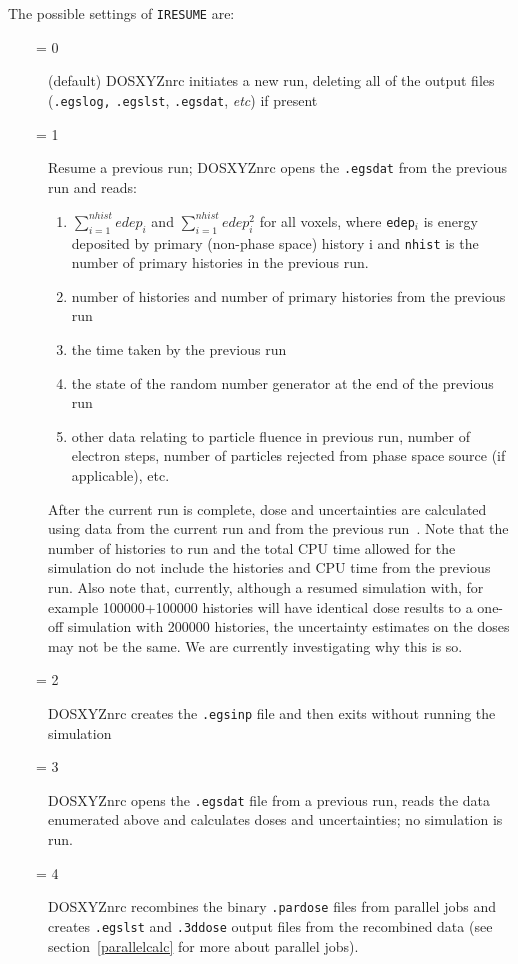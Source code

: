 \documentclass[12pt,twoside]{article}      %
\newcommand{\etc}{{\em etc}}
\newcommand{\indexm}[1]{\index{#1}}
\begin{document}
\indexm{.egsdat}
The possible settings of {\tt IRESUME} are:
\begin{description}
\item [~~~~= 0] (default) DOSXYZnrc initiates a new run, deleting all of the output
files ({\tt .egslog,} {\tt .egslst}, {\tt .egsdat}, \etc) if present
\item [~~~~= 1] Resume a previous run; DOSXYZnrc opens the
{\tt .egsdat} from the previous run and reads:
\begin{enumerate}
\item $\sum_{i=1}^{nhist}edep_i$ and $\sum_{i=1}^{nhist}edep_i^2$ for
all voxels, where {\tt edep$_i$} is energy deposited by primary (non-phase space)
history i
and {\tt nhist} is the number of primary histories in the previous run.
\item number of histories and number of primary histories from the previous run
\item the time taken by the previous run
\item the state of the random number generator at the end of the
previous run
\item other data relating to particle fluence in previous run, number of
electron steps, number of particles rejected from phase space source (if
applicable), etc.
\end{enumerate}
After the current run is complete, dose and
uncertainties are calculated using data from the current run and from
the previous run~\cite{Wa02a}.  Note that the
number of histories to run and the total CPU time allowed for the
simulation do not include the histories and CPU time from the previous run.
Also note that, currently, although a resumed simulation with, for example
100000+100000 histories will have identical dose results to a one-off
simulation
with 200000 histories, the uncertainty estimates on the doses may not be
the same.  We are currently investigating why this is so.
\item [~~~~= 2] DOSXYZnrc creates the {\tt .egsinp} file and then exits without
running the simulation
\item [~~~~= 3] DOSXYZnrc opens the {\tt .egsdat} file from a previous run,
reads the data enumerated above and calculates doses and uncertainties;
no simulation is run.
\indexm{.pardose}
\item [~~~~= 4] DOSXYZnrc recombines the binary {\tt .pardose} files from
parallel jobs and creates {\tt .egslst} and {\tt .3ddose} output
files from the recombined data (see section~\ref{parallelcalc} for
more about parallel jobs).
\end{description}
\end{document}
